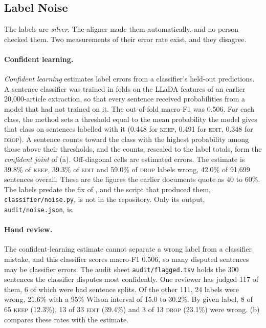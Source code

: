 \documentclass[]{paper}
\newcommand{\keep}{\textsc{keep}}
\newcommand{\edit}{\textsc{edit}}
\newcommand{\drop}{\textsc{drop}}
\begin{document}
\subsection{Label Noise}
\label{sec:noise}

The labels are \emph{silver}. The aligner made them automatically, and no person checked them. Two measurements of their error rate exist, and they disagree.

\paragraph{Confident learning.} \emph{Confident learning} \citep{northcutt-etal-2021-confident} estimates label errors from a classifier's held-out predictions. A sentence classifier was trained in folds on the LLaDA features of an earlier 20,000-article extraction, so that every sentence received probabilities from a model that had not trained on it. The out-of-fold macro-F1 was 0.506. For each class, the method sets a threshold equal to the mean probability the model gives that class on sentences labelled with it (0.448 for \keep{}, 0.491 for \edit{}, 0.348 for \drop{}). A sentence counts toward the class with the highest probability among those above their thresholds, and the counts, rescaled to the label totals, form the \emph{confident joint} of (a). Off-diagonal cells are estimated errors. The estimate is 39.8\% of \keep{}, 39.3\% of \edit{} and 59.0\% of \drop{} labels wrong, 42.0\% of 91,699 sentences overall. These are the figures the earlier documents quote as 40 to 60\%. The labels predate the fix of , and the script that produced them, \texttt{classifier/noise.py}, is not in the repository. Only its output, \texttt{audit/noise.json}, is.

\paragraph{Hand review.} The confident-learning estimate cannot separate a wrong label from a classifier mistake, and this classifier scores macro-F1 0.506, so many disputed sentences may be classifier errors. The audit sheet \texttt{audit/flagged.tsv} holds the 300 sentences the classifier disputes most confidently. One reviewer has judged 117 of them, 6 of which were bad sentence splits. Of the other 111, 24 labels were wrong, 21.6\% with a 95\% Wilson interval of 15.0 to 30.2\%. By given label, 8 of 65 \keep{} (12.3\%), 13 of 33 \edit{} (39.4\%) and 3 of 13 \drop{} (23.1\%) were wrong. (b) compares these rates with the estimate.
\end{document}
